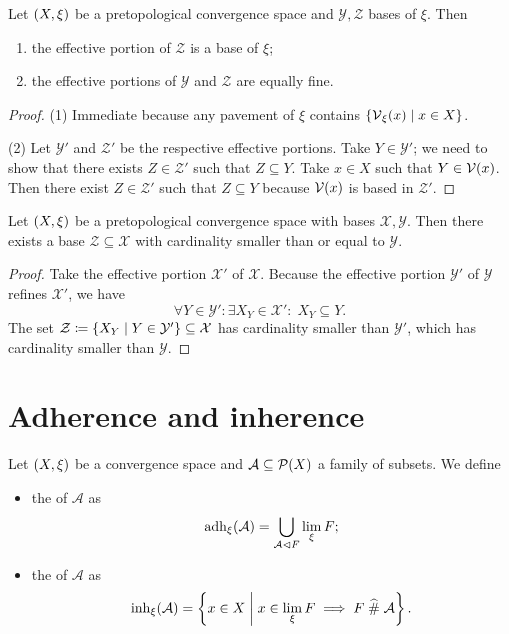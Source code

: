 \begin{lemma}
Let $\left( X,\xi \right)$ be a pretopological convergence space and $\mathcal{Y}, \mathcal{Z}$ bases of $\xi$. Then
\begin{enumerate}
\item the effective portion of $\mathcal{Z}$ is a base of $\xi$;
\item the effective portions of $\mathcal{Y}$ and $\mathcal{Z}$ are equally fine.
\end{enumerate}
\end{lemma}
\begin{proof}
(1) Immediate because any pavement of $\xi$ contains $\left\{ \operatorname{\mathcal{V}}_\xi(x) \;\middle|\; x\in X \right\}$.

(2) Let $\mathcal{Y}'$ and $\mathcal{Z}'$ be the respective effective portions. Take $Y\in \mathcal{Y}'$; we need to show that there exists $Z\in \mathcal{Z}'$ such that $Z\subseteq Y$. Take $x\in X$ such that $Y\in \operatorname{\mathcal{V}}(x)$. Then there exist $Z \in \mathcal{Z}'$ such that $Z\subseteq Y$ because $\operatorname{\mathcal{V}}(x)$ is based in $\mathcal{Z}'$. 
\end{proof}
\begin{corollary} \label{cardinalityPretopologicalBase}
Let $\left( X,\xi \right)$ be a pretopological convergence space with bases $\mathcal{X},\mathcal{Y}$. Then there exists a base $\mathcal{Z} \subseteq \mathcal{X}$ with cardinality smaller than or equal to $\mathcal{Y}$.
\end{corollary}
\begin{proof}
Take the effective portion $\mathcal{X}'$ of $\mathcal{X}$. Because the effective portion $\mathcal{Y}'$ of $\mathcal{Y}$ refines $\mathcal{X}'$, we have
\[ \forall Y\in \mathcal{Y}': \exists X_Y \in \mathcal{X}': \; X_Y\subseteq Y. \]
The set $\mathcal{Z} \coloneqq \left\{ X_Y \;\middle|\; Y\in \mathcal{Y}' \right\} \subseteq \mathcal{X}$ has cardinality smaller than $\mathcal{Y}'$, which has cardinality smaller than $\mathcal{Y}$.
\end{proof}

\section{Adherence and inherence}
\begin{definition}
Let $\left( X,\xi \right)$ be a convergence space and $\mathcal{A}\subseteq \operatorname{\mathcal{P}}(X)$ a family of subsets. We define
\begin{itemize}
\item the  of $\mathcal{A}$ as
\[ \operatorname{adh}_\xi(\mathcal{A}) = \bigcup_{\mathcal{A}\lhd F}\lim_\xi F; \]
\item the  of $\mathcal{A}$ as
\[ \operatorname{inh}_\xi(\mathcal{A}) = \left\{ x\in X \;\middle|\; x\in \lim_\xi F \implies F\mathrel{\widehat{\#}}\mathcal{A} \right\}. \]
\end{itemize}
\end{definition}

